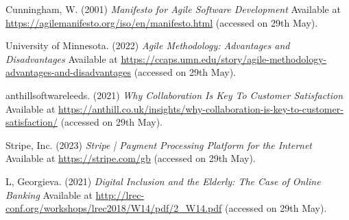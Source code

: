 \noindent [10] Cunningham, W. (2001) \textit{Manifesto for Agile Software Development} Available at \url{https://agilemanifesto.org/iso/en/manifesto.html} (accessed on 29th May).
\vspace{0.2cm}

\noindent [11] University of Minnesota. (2022) \textit{Agile Methodology: Advantages and Disadvantages} Available at \url{https://ccaps.umn.edu/story/agile-methodology-advantages-and-disadvantages} (accessed on 29th May).
\vspace{0.2cm}

\noindent [12] anthillsoftwareleeds. (2021) \textit{Why Collaboration Is Key To Customer Satisfaction} Available at \url{https://anthill.co.uk/insights/why-collaboration-is-key-to-customer-satisfaction/} (accessed on 29th May).
\vspace{0.2cm}

\noindent [13] Stripe, Inc. (2023) \textit{Stripe | Payment Processing Platform for the Internet} Available at \url{https://stripe.com/gb} (accessed on 29th May).
\vspace{0.2cm}

\noindent [14] L, Georgieva. (2021) \textit{Digital Inclusion and the Elderly: The Case of Online Banking} Available at \url{http://lrec-conf.org/workshops/lrec2018/W14/pdf/2_W14.pdf} (accessed on 29th May).
\vspace{0.2cm}

\newpage
